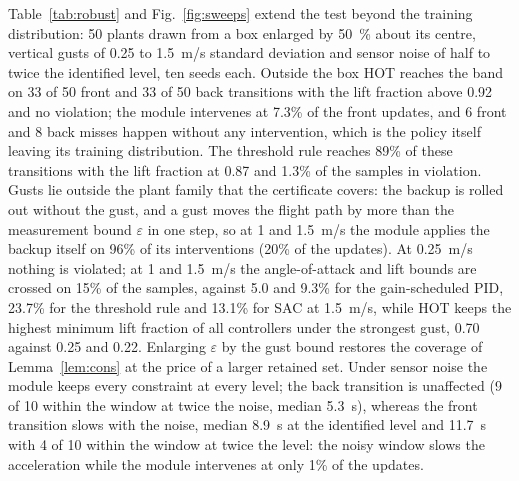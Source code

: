 \documentclass[final,5p,times,twocolumn]{elsarticle}
\newcommand{\hotGustOneHalfLf}{0.70}
\newcommand{\hotGustStrongInterv}{20}
\newcommand{\hotGustStrongUnverShare}{96}
\newcommand{\hotGustStrongViol}{15}
\newcommand{\hotNoiseInterv}{1}
\newcommand{\hotNoiseOneFrontTmed}{8.9}
\newcommand{\hotNoiseTwoBackReached}{9}
\newcommand{\hotNoiseTwoBackTmed}{5.3}
\newcommand{\hotNoiseTwoFrontReached}{4}
\newcommand{\hotNoiseTwoFrontTmed}{11.7}
\newcommand{\hotOutBackN}{50}
\newcommand{\hotOutBackReached}{33}
\newcommand{\hotOutBackStalledNoInt}{8}
\newcommand{\hotOutFrontIntervPct}{7.3}
\newcommand{\hotOutFrontN}{50}
\newcommand{\hotOutFrontReached}{33}
\newcommand{\hotOutFrontStalledNoInt}{6}
\newcommand{\hotOutLf}{0.92}
\newcommand{\numOutbox}{50}
\newcommand{\pidGustOneHalfViol}{9.3}
\newcommand{\pidGustOneViol}{5.0}
\newcommand{\sacGustOneHalfLf}{0.22}
\newcommand{\sacGustOneHalfViol}{13.1}
\newcommand{\thrGustOneHalfLf}{0.25}
\newcommand{\thrGustOneHalfViol}{23.7}
\newcommand{\thrOutLf}{0.87}
\newcommand{\thrOutReached}{89\%}
\newcommand{\thrOutViol}{1.3}
\begin{document}
Table~\ref{tab:robust} and Fig.~\ref{fig:sweeps} extend the test beyond the training distribution: \numOutbox{} plants drawn from a box enlarged by \SI{50}{\percent} about its centre, vertical gusts of 0.25 to \SI{1.5}{m/s} standard deviation and sensor noise of half to twice the identified level, ten seeds each. Outside the box HOT reaches the band on \hotOutFrontReached{} of \hotOutFrontN{} front and \hotOutBackReached{} of \hotOutBackN{} back transitions with the lift fraction above \hotOutLf{} and no violation; the module intervenes at \hotOutFrontIntervPct{}\% of the front updates, and \hotOutFrontStalledNoInt{} front and \hotOutBackStalledNoInt{} back misses happen without any intervention, which is the policy itself leaving its training distribution. The threshold rule reaches \thrOutReached{} of these transitions with the lift fraction at \thrOutLf{} and \thrOutViol{}\% of the samples in violation. Gusts lie outside the plant family that the certificate covers: the backup is rolled out without the gust, and a gust moves the flight path by more than the measurement bound $\varepsilon$ in one step, so at 1 and \SI{1.5}{m/s} the module applies the backup itself on \hotGustStrongUnverShare{}\% of its interventions (\hotGustStrongInterv{}\% of the updates). At \SI{0.25}{m/s} nothing is violated; at 1 and \SI{1.5}{m/s} the angle-of-attack and lift bounds are crossed on \hotGustStrongViol{}\% of the samples, against \pidGustOneViol{} and \pidGustOneHalfViol{}\% for the gain-scheduled PID, \thrGustOneHalfViol{}\% for the threshold rule and \sacGustOneHalfViol{}\% for SAC at \SI{1.5}{m/s}, while HOT keeps the highest minimum lift fraction of all controllers under the strongest gust, \hotGustOneHalfLf{} against \thrGustOneHalfLf{} and \sacGustOneHalfLf{}. Enlarging $\varepsilon$ by the gust bound restores the coverage of Lemma~\ref{lem:cons} at the price of a larger retained set. Under sensor noise the module keeps every constraint at every level; the back transition is unaffected (\hotNoiseTwoBackReached{} of 10 within the window at twice the noise, median \hotNoiseTwoBackTmed{}~s), whereas the front transition slows with the noise, median \hotNoiseOneFrontTmed{}~s at the identified level and \hotNoiseTwoFrontTmed{}~s with \hotNoiseTwoFrontReached{} of 10 within the window at twice the level: the noisy window slows the acceleration while the module intervenes at only \hotNoiseInterv{}\% of the updates.
\end{document}
